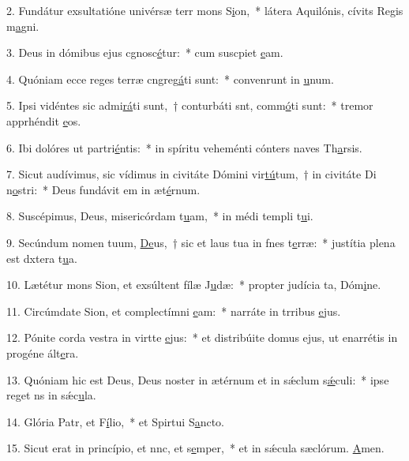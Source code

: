 2. Fundátur exsultatióne univérsæ terr mons S\uline{i}on,~* látera Aquilónis, cívits Regis m\uline{a}gni.\par 
3. Deus in dómibus ejus cgnosc\uline{é}tur:~* cum suscpiet \uline{e}am.\par 
4. Quóniam ecce reges terræ cngreg\uline{á}ti sunt:~* convenrunt in \uline{u}num.\par 
5. Ipsi vidéntes sic admi\uline{rá}ti sunt,~† conturbáti snt, comm\uline{ó}ti sunt:~* tremor apprhéndit \uline{e}os.\par 
6. Ibi dolóres ut partri\uline{é}ntis:~* in spíritu veheménti cónters naves Th\uline{a}rsis.\par 
7. Sicut audívimus, sic vídimus in civitáte Dómini vir\uline{tú}tum,~† in civitáte Di n\uline{o}stri:~* Deus fundávit em in æt\uline{é}rnum.\par 
8. Suscépimus, Deus, misericórdam t\uline{u}am,~* in médi templi t\uline{u}i.\par 
9. Secúndum nomen tuum, \uline{De}us,~† sic et laus tua in fnes t\uline{e}rræ:~* justítia plena est dxtera t\uline{u}a.\par 
10. Lætétur mons Sion, et exsúltent fílæ J\uline{u}dæ:~* propter judícia ta, Dóm\uline{i}ne.\par 
11. Circúmdate Sion, et complectímni \uline{e}am:~* narráte in trribus \uline{e}jus.\par 
12. Pónite corda vestra in virtte \uline{e}jus:~* et distribúite domus ejus, ut enarrétis in progéne ált\uline{e}ra.\par 
13. Quóniam hic est Deus, Deus noster in ætérnum et in sǽclum s\uline{ǽ}culi:~* ipse reget ns in sǽc\uline{u}la.\par 
14. Glória Patr, et F\uline{í}lio,~* et Spirtui S\uline{a}ncto.\par 
15. Sicut erat in princípio, et nnc, et s\uline{e}mper,~* et in sǽcula sæclórum. \uline{A}men.\par 
